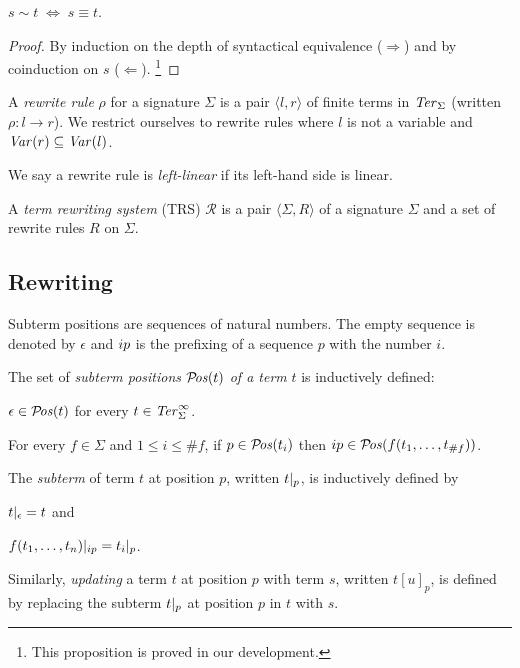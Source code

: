 \begin{proposition}\label{prop:equalities}
$s \sim t \; \Leftrightarrow \; s \equiv t$.
\end{proposition}
\begin{proof}
By induction on the depth of syntactical equivalence ($\Rightarrow$) and by
coinduction on $s$ ($\Leftarrow$).
\footnote{This proposition is proved in our \Coq development.}
\end{proof}

\begin{definition}%
  A \emph{rewrite rule} $\rho$ for a signature $\Sigma$ is a pair $\langle l,
  r \rangle$ of finite terms in $\mathit{Ter}_\Sigma$ (written $\rho : l \rightarrow
  r$). We restrict ourselves to rewrite rules where $l$ is not a variable and
  $\mathit{Var}(r) \subseteq \mathit{Var}(l)$.
\end{definition}

We say a rewrite rule is \emph{left-linear} if its left-hand side is linear.

\begin{definition}%
A \emph{term rewriting system} (TRS) $\mathcal{R}$ is a pair $\langle \Sigma,
R \rangle$ of a signature $\Sigma$ and a set of rewrite rules $R$ on
$\Sigma$.
\end{definition}


\subsection{Rewriting}

Subterm positions are sequences of natural numbers. The empty sequence
is denoted by $\epsilon$ and $i p$ is the prefixing of a
sequence $p$ with the number $i$.

\begin{definition}%
  The set of \emph{subterm positions} $\mathcal{P}\!\mathit{os}(t)$ \emph{of a term} $t$
  is inductively defined:
  \begin{compactenum}
    \item $\epsilon \in \mathcal{P}\!\mathit{os}(t)$ for every $t \in \mathit{Ter}_\Sigma^\infty$.
    \item For every $f \in \Sigma$ and $1 \le i \le \#f$, if $p \in
      \mathcal{P}\!\mathit{os}(t_i)$ then $i p \in \mathcal{P}\!\mathit{os}(f(t_1, \ldots,
      t_{\#f}))$.
  \end{compactenum}
  The \emph{subterm} of term $t$ at position $p$, written
  $t |_{p}$, is inductively defined by
  \begin{inparaenum}[(i)]
    \item $t |_{\epsilon} = t$ and
    \item $f(t_1, \ldots, t_n) |_{i p} =
      t_i |_{p}$.
  \end{inparaenum}
  Similarly, \emph{updating} a term $t$ at position $p$ with term $s$,
  written $t[u]_p$, is defined by replacing the subterm
  $t |_{p}$ at position $p$ in $t$ with $s$.
\end{definition}

